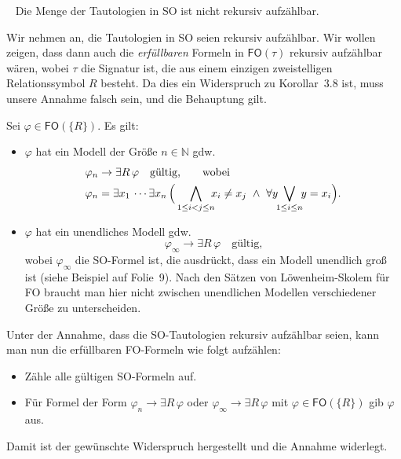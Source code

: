 \documentclass[fontsize=11pt, twoside=false, numbers=autoenddot]{scrbook}
\begin{document}
~
\noindent
Die Menge der Tautologien in SO ist nicht rekursiv aufzählbar.
%
\begin{beweis}
  Wir nehmen an, die Tautologien in SO seien rekursiv aufzählbar.
  Wir wollen zeigen, dass dann auch die \emph{erfüllbaren} Formeln in $\textsf{FO}(\tau)$ rekursiv aufzählbar wären,
  wobei $\tau$ die Signatur ist, die aus einem einzigen zweistelligen Relationssymbol $R$ 
  besteht. Da dies ein Widerspruch zu Korollar~3.8 ist, muss unsere Annahme falsch sein, und die Behauptung gilt.

  Sei $\varphi \in \textsf{FO}(\{R\})$.
  Es gilt:
  \begin{itemize}
    \item
      $\varphi$ hat ein Modell der Größe $n \in \mathbb{N}$ gdw.
      \begin{align*}
        & \varphi_n \to \exists R\, \varphi \quad \text{gültig,\qquad wobei} \\
        & \varphi_n = \exists x_1\,\cdots\exists x_n\,
        \Big(
          \bigwedge_{1 \leq i < j \leq n} \!\!\! x_i \neq x_j
          ~\land~
          \forall y \!\! \bigvee_{1 \leq i \leq n} \!\! y = x_i
        \Big).
      \end{align*}
    \item
      $\varphi$ hat ein unendliches Modell gdw.
      \[
        \varphi_\infty \to \exists R\, \varphi \quad \text{gültig,}
      \]
      wobei $\varphi_\infty$ die SO-Formel ist, die ausdrückt, dass ein Modell unendlich groß ist
      (siehe Beispiel auf Folie~9).
      Nach den Sätzen von Löwenheim-Skolem für FO braucht man hier nicht zwischen
      unendlichen Modellen verschiedener Größe zu unterscheiden.
  \end{itemize}
  Unter der Annahme, dass die SO-Tautologien rekursiv aufzählbar seien,
  kann man nun die erfüllbaren FO-Formeln wie folgt aufzählen:
  \begin{itemize}
    \item
      Zähle alle gültigen SO-Formeln auf.
    \item
      Für Formel der Form $\varphi_n \to \exists R\,\varphi$
      oder $\varphi_\infty \to \exists R\,\varphi$
      mit $\varphi \in \textsf{FO}(\{R\})$
      gib $\varphi$ aus.
  \end{itemize}
  Damit ist der gewünschte Widerspruch hergestellt und die Annahme widerlegt.
  \qedhere
\end{beweis}%
\end{document}
